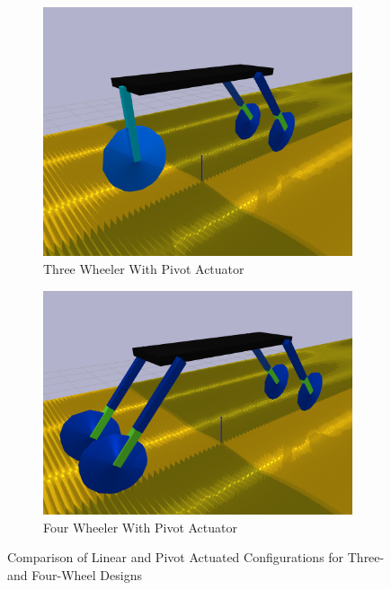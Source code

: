 \begin{figure}[h!]
    \begin{subfigure}[b]{0.45\linewidth}
        \centering
        \includegraphics[width=\linewidth]{Figures/ch8_PivotThreeWheel.png}
        \caption{Three Wheeler With Pivot Actuator}
    \end{subfigure}
    \hfill
    \begin{subfigure}[b]{0.45\linewidth}
        \centering
        \includegraphics[width=\linewidth]{Figures/ch8_PivotFourWheel.png}
        \caption{Four Wheeler With Pivot Actuator}
    \end{subfigure}
    
    \caption{Comparison of Linear and Pivot Actuated Configurations for Three- and Four-Wheel Designs}
    \label{fig:actuator-configs}
\end{figure}

